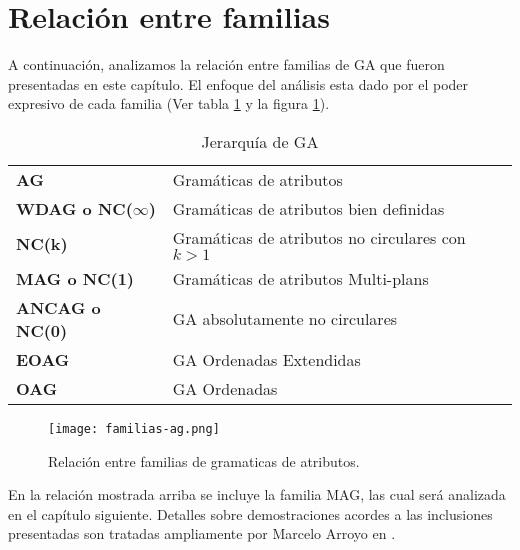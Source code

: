 \section{Relación entre familias}
\label{sec:relfamag}
A continuación, analizamos la relación entre familias de GA que fueron presentadas en este capítulo. El enfoque del análisis esta dado por el poder expresivo de cada familia (Ver tabla \ref{jer-GA} y la figura \ref{jer-GA2}).

\begin{table}[!h]\centering
\begin{tabular}{ll}
\textbf{AG}         & Gramáticas de atributos \\
\textbf{WDAG o NC($\infty$)}       & Gramáticas de atributos bien definidas\\
\textbf{NC(k)}       & Gramáticas de atributos no circulares con $k > 1$\\
\textbf{MAG o NC(1)}       & Gramáticas de atributos Multi-plans\\
\textbf{ANCAG o NC(0)}      & GA absolutamente no circulares \\
\textbf{EOAG}       & GA Ordenadas Extendidas \\
\textbf{OAG}        & GA Ordenadas \\
\end{tabular}
\caption{Jerarquía de GA}
\label{jer-GA}
\end{table}

\begin{figure}\centering
\texttt{[image: familias-ag.png]}
\caption{\label{jer-GA2}Relación entre familias de gramaticas de atributos.} 
\end{figure}


En la relación mostrada arriba se incluye la familia MAG, las cual será analizada en el capítulo siguiente.
Detalles sobre demostraciones acordes a las inclusiones presentadas son tratadas ampliamente por Marcelo Arroyo en \cite{tesismarcelo}.